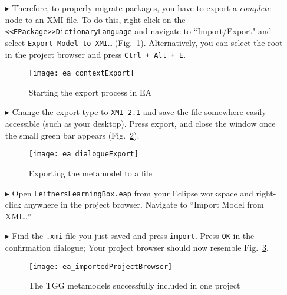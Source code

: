 \begin{itemize}
\clearpage

\item[$\blacktriangleright$] Therefore, to properly migrate packages, you have to export a \emph{complete} node to an XMI file. To do this, right-click on the
\texttt{<<EPack\-age>>DictionaryLanguage} and navigate to ``Import/Export" and select \texttt{Export Model to XMI\ldots} (Fig.~\ref{fig:contextExport}).
Alternatively, you can select the root in the project browser and press \texttt{Ctrl + Alt + E}.

\vspace{0.5cm}

\begin{figure}[htbp]
\begin{center}
  \texttt{[image: ea\_contextExport]}
  \caption{Starting the export process in EA}
  \label{fig:contextExport}
\end{center}
\end{figure}

\item[$\blacktriangleright$] Change the export type to \texttt{XMI 2.1} and save the file somewhere easily accessible (such as your desktop). Press export, and
close the window once the small green bar appears (Fig.~\ref{fig:export}).

\vspace{0.5cm}

\begin{figure}[htbp]
\begin{center}
  \texttt{[image: ea\_dialogueExport]}
  \caption{Exporting the metamodel to a file}
  \label{fig:export}
\end{center}
\end{figure}

\item[$\blacktriangleright$] Open \texttt{LeitnersLearningBox.eap} from your Eclipse workspace and right-click anywhere in the project browser. Navigate to
``Import Model from XMI\ldots''

\item[$\blacktriangleright$] Find the \texttt{.xmi} file you just saved and press \texttt{import}. Press \texttt{OK} in the confirmation dialogue; Your project
browser should now resemble Fig.~\ref{fig:importProBrowser}.

\begin{figure}[htbp]
\begin{center}
  \texttt{[image: ea\_importedProjectBrowser]}
  \caption{The TGG metamodels successfully included in one project}
  \label{fig:importProBrowser}
\end{center}
\end{figure}


\end{itemize}
